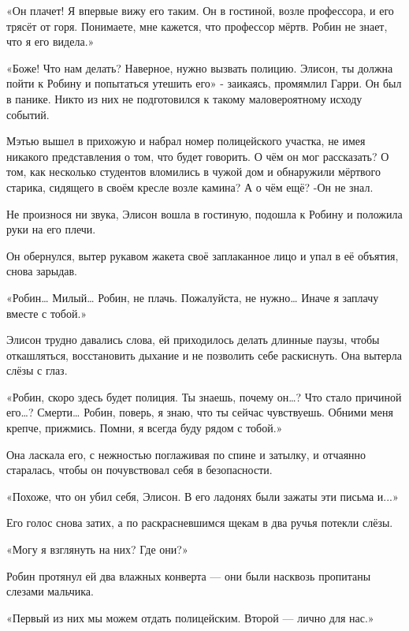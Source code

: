 \documentclass[a5paper, 9pt,
final, openany, twoside=true]{memoir}
\begin{document}
«Он плачет! Я впервые вижу его таким. Он в гостиной, возле профессора, и его трясёт от горя. Понимаете, мне кажется, что профессор мёртв. Робин не знает, что я его видела.»

«Боже! Что нам делать? Наверное, нужно вызвать полицию. Элисон, ты должна пойти к Робину и попытаться утешить его» - заикаясь, промямлил Гарри. Он был в панике. Никто из них не подготовился к такому маловероятному исходу событий.

Мэтью вышел в прихожую и набрал номер полицейского участка, не имея никакого представления о том, что будет говорить. О чём он мог рассказать? О том, как несколько студентов вломились в чужой дом и обнаружили мёртвого старика, сидящего в своём кресле возле камина? А о чём ещё? -Он не знал.\bigskip

Не произнося ни звука, Элисон вошла в гостиную, подошла к Робину и положила руки на его плечи.

Он обернулся, вытер рукавом жакета своё заплаканное лицо и упал в её объятия, снова зарыдав.

«Робин… Милый… Робин, не плачь. Пожалуйста, не нужно… Иначе я заплачу вместе с тобой.»

Элисон трудно давались слова, ей приходилось делать длинные паузы, чтобы откашляться, восстановить дыхание и не позволить себе раскиснуть. Она вытерла слёзы с глаз.

«Робин, скоро здесь будет полиция. Ты знаешь, почему он…? Что стало причиной его…? Смерти… Робин, поверь, я знаю, что ты сейчас чувствуешь. Обними меня крепче, прижмись. Помни, я всегда буду рядом с тобой.»

Она ласкала его, с нежностью поглаживая по спине и затылку, и отчаянно старалась, чтобы он почувствовал себя в безопасности.

«Похоже, что он убил себя, Элисон. В его ладонях были зажаты эти письма и...»

Его голос снова затих, а по раскрасневшимся щекам в два ручья потекли слёзы.

«Могу я взглянуть на них? Где они?»

Робин протянул ей два влажных конверта — они были насквозь пропитаны слезами мальчика.

«Первый из них мы можем отдать полицейским. Второй — лично для нас.»
\end{document}
